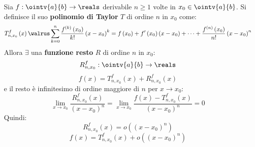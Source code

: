 \begin{theorem}
  Sia $f:\ointv{a}{b}\to\reals$ derivabile $n\ge1$ volte in $x_0\in\ointv{a}{b}$. Si definisce il suo \textbf{polinomio di Taylor} $T$ di ordine $n$ in $x_0$ come:
  $$T_{n,x_0}^f\left(x\right)\walrus \sum_{k=0}^n\frac{f^{\left(k\right)}\left(x_0\right)}{k!}\left(x-x_0\right)^k=f\left( x_0 \right)+f'\left( x_0 \right)\left( x-x_0 \right)+\cdots+\frac{f^{\left(n\right)}\left(x_0\right)}{n!}\left(x-x_0\right)^n$$
  Allora $\exists$ una \textbf{funzione resto} $R$ di ordine $n$ in $x_0$:
  $$R_{n,x_0}^f:\ointv{a}{b}\to\reals$$
  $$f\left(x\right)=T_{n,x_0}^f\left(x\right)+R_{n,x_0}^f\left(x\right)$$
  e il resto è infinitesimo di ordine maggiore di $n$ per $x\to x_0$:
  $$\lim_{x\to x_0}\frac{R_{n,x_0}^f\left( x \right)}{\left( x-x_0 \right)^n}=\lim_{x\to x_0}\frac{f\left(x\right)-T_{n,x_0}^f\left(x\right)}{\left(x-x_0\right)^n}=0$$
  Quindi: 
  $$R_{n,x_0}^f\left(x\right)=o\left(\left(x-x_0\right)^n\right)$$
  $$f\left(x\right)=T_{n,x_0}^f\left(x\right)+o\left(\left(x-x_0\right)^n\right)$$
\end{theorem}
